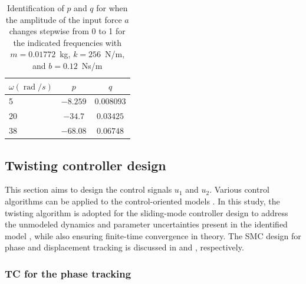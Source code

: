 \documentclass[preprint,12pt]{elsarticle}
\DeclareMathOperator{\rad}{rad}
\begin{document}
\begin{table}
    \centering 
    \begin{tabular}{|l|c|c|} \hline
       $\omega (\rad/s)$   & $p$ & $q$  \\ \hline
       5   & $-8.259$ & $0.008093$  \\ \hline
         20   & $-34.7$ & $0.03425$  \\ \hline
       38   & $-68.08$ & $0.06748$  \\ \hline
    \end{tabular}
    \vspace{0.1cm}
    \caption{Identification of $p$ and $q$ for  when the amplitude of the input force $a$ changes stepwise from 0 to 1 for the indicated frequencies with $m=0.01772$~kg, $k=256$~N/m, and $b=0.12$~Ns/m}
    \label{T_identification_amplitude}
\end{table}


\subsection{Twisting controller design} \label{S_SMC_design}

This section aims to design the control signals $u_1$ and $u_2$. Various control algorithms can be applied to the control-oriented models . In this study, the twisting algorithm is adopted for the sliding-mode controller design to address the unmodeled dynamics and parameter uncertainties present in the identified model , while also ensuring finite-time convergence in theory. The SMC design for phase and displacement tracking is discussed in  and , respectively.

\subsubsection{TC for the phase tracking} \label{S_SMC_phase}
\end{document}
